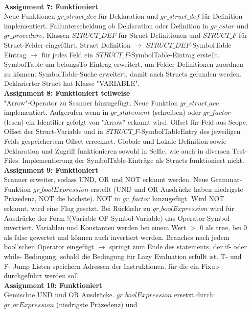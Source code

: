 \documentclass[10pt, a4paper]{article}
\begin{document}
\\
\textbf{Assignment 7: Funktioniert}\\
Neue Funktionen $gr\_struct\_dec$ für Deklaration und $gr\_struct\_def$ für Definition implementiert. Fallunterscheidung ob Deklaration oder Definition in $gr\_cstar$ und $gr\_procedure$. Klassen $STRUCT\_DEF$ für Struct-Definitionen und $STRUCT\_F$ für Struct-Felder eingeführt. Struct Definition $\rightarrow$ $STRUCT\_DEF$-SymbolTable Eintrag $\rightarrow$ für jedes Feld ein $STRUCT\_F$-SymbolTable-Eintrag erstellt. SymbolTable um belongsTo Eintrag erweitert, um Felder Definitionen zuordnen zu können. SymbolTable-Suche erweitert, damit auch Structs gefunden werden. Deklarierter Struct hat Klasse "VARIABLE".
\\
\textbf{Assignment 8: Funktioniert teilweise}\\
"Arrow"-Operator zu Scanner hinzugefügt. Neue Funktion $gr\_struct\_acc$ implementiert. Aufgerufen wenn in $gr\_statement$ (schreiben) oder $gr\_factor$ (lesen) ein Identifier gefolgt von "Arrow" erkannt wird. Offset für Feld aus Scope, Offset der Struct-Variable und in $STRUCT\_F$-SymbolTableEntry des jeweiligen Felds gespeichertem Offset errechnet.
Globale und Lokale Definition sowie Deklaration und Zugriff funktionieren sowohl in Selfie, wie auch in diversen Test-Files. Implementierung der SymbolTable-Einträge als Structs funktioniert nicht. 
\\
\textbf{Assignment 9: Funktioniert}\\
Scanner erweiter, sodass UND, OR und NOT erkannt werden. Neue Grammar-Funktion $gr\_boolExpression$ erstellt (UND und OR Ausdrücke haben niedrigste Präzedenz, NOT die höchste). NOT in $gr\_factor$ hinzugefügt. Wird NOT erkannt, wird eine Flag gesetzt. Bei Rückkehr zu $gr\_boolExpression$ wird für Ausdrücke der Form !(Variable OP-Symbol Variable) das Operator-Symbol invertiert. Variablen und Konstanten werden bei einem Wert $>$ 0 als true, bei 0 als false gewertet und können auch invertiert werden. Branches nach jedem bool'schen Operator eingefügt $\rightarrow$ springt zum Ende des statements, der if- oder while- Bedingung, sobald die Bedingung für Lazy Evaluation erfüllt ist. T- und F- Jump Listen speichern Adressen der Instruktionen, für die ein Fixup durchgeführt werden soll.
\\
\textbf{Assignment 10: Funktioniert}\\
Gemischte UND und OR Ausdrücke. $gr\_boolExpression$ ersetzt durch: $gr\_orExpression$ (niedrigste Präzedenz) und \\
\end{document}
